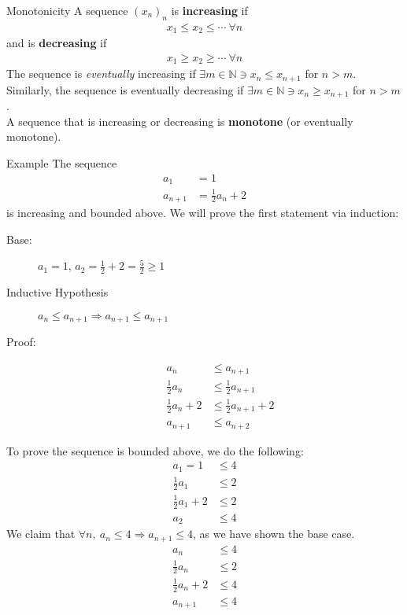 \documentclass[10pt]{extarticle}
\newcommand{\N}{\mathbb{N}}
\begin{document}
  \begin{problem}{Monotonicity}
    A sequence $(x_n)_n$ is \textbf{increasing} if
    \begin{align*}
      x_1 \leq x_2 \leq \cdots~\forall n
    \end{align*}
    and is \textbf{decreasing} if
    \begin{align*}
      x_1 \geq x_2 \geq \cdots~\forall n
    \end{align*}
    The sequence is \textit{eventually} increasing if $\exists m\in \N \ni x_n \leq x_{n+1}$ for $n > m$.\\

    Similarly, the sequence is eventually decreasing if $\exists m\in\N \ni x_n \geq x_{n+1}$ for $n > m$.\\

    A sequence that is increasing or decreasing is \textbf{monotone} (or eventually monotone).\\

    \begin{problem}{Example}
      The sequence
      \begin{align*}
        a_1 &= 1\\
        a_{n+1} &= \frac{1}{2}a_n + 2
      \end{align*}
      is increasing and bounded above.
      \tcblower
      We will prove the first statement via induction:
      \begin{description}
        \item[Base:] $a_1 = 1$, $a_2 = \frac{1}{2} + 2 = \frac{5}{2} \geq 1$
        \item[Inductive Hypothesis] $a_n \leq a_{n+1} \Rightarrow a_{n+1} \leq a_{n+1}$
        \item[Proof:]
          \begin{align*}
            a_{n} &\leq a_{n+1}\\
            \frac{1}{2}a_n &\leq \frac{1}{2}a_{n+1}\\
            \frac{1}{2}a_n + 2 &\leq \frac{1}{2}a_{n+1} + 2\\
            a_{n+1} &\leq a_{n+2}
          \end{align*}
      \end{description}
      To prove the sequence is bounded above, we do the following:
      \begin{align*}
        a_1 = 1 &\leq 4\\
        \frac{1}{2}a_1 &\leq 2\\
        \frac{1}{2}a_1 + 2 &\leq 2\\
        a_{2} &\leq 4
      \end{align*}
      We claim that $\forall n,~a_n \leq 4 \Rightarrow a_{n+1} \leq 4$, as we have shown the base case.
      \begin{align*}
        a_{n} &\leq 4\\
        \frac{1}{2}a_n &\leq 2\\
        \frac{1}{2}a_n + 2 &\leq 4\\
        a_{n+1} &\leq 4
      \end{align*}
    \end{problem}
  \end{problem}
\end{document}
